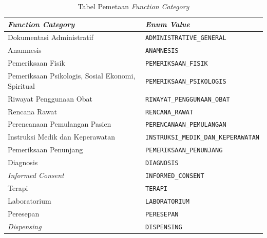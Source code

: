 \documentclass[bahasa, 12pt, a4paper, onecolumn, oneside, final]{report}
\begin{document}
\begin{table}[!ht]
	\centering
	\caption{Tabel Pemetaan \textit{Function Category}}
	\label{tab:mapping-function-category}
	\small
	\begin{tabular}{|p{}|p{}|}
		\hline
		\textbf{\textit{Function Category}} & \textbf{\textit{Enum Value}}                \\ \hline

		Dokumentasi Administratif
		                                    & \texttt{ADMINISTRATIVE\_GENERAL}
		\\ \hline

		Anamnesis
		                                    & \texttt{ANAMNESIS}
		\\ \hline

		Pemeriksaan Fisik
		                                    & \texttt{PEMERIKSAAN\_FISIK}
		\\ \hline

		Pemeriksaan Psikologis, Sosial Ekonomi, Spiritual
		                                    & \texttt{PEMERIKSAAN\_PSIKOLOGIS}
		\\ \hline

		Riwayat Penggunaan Obat
		                                    & \texttt{RIWAYAT\_PENGGUNAAN\_OBAT}
		\\ \hline

		Rencana Rawat
		                                    & \texttt{RENCANA\_RAWAT}
		\\ \hline

		Perencanaan Pemulangan Pasien
		                                    & \texttt{PERENCANAAN\_PEMULANGAN}
		\\ \hline

		Instruksi Medik dan Keperawatan
		                                    & \texttt{INSTRUKSI\_MEDIK\_DAN\_KEPERAWATAN}
		\\ \hline

		Pemeriksaan Penunjang
		                                    & \texttt{PEMERIKSAAN\_PENUNJANG}
		\\ \hline

		Diagnosis
		                                    & \texttt{DIAGNOSIS}
		\\ \hline

		\textit{Informed Consent}
		                                    & \texttt{INFORMED\_CONSENT}
		\\ \hline

		Terapi
		                                    & \texttt{TERAPI}
		\\ \hline

		Laboratorium
		                                    & \texttt{LABORATORIUM}
		\\ \hline

		Peresepan
		                                    & \texttt{PERESEPAN}
		\\ \hline

		\textit{Dispensing}
		                                    & \texttt{DISPENSING}
		\\ \hline
	\end{tabular}

\end{table}
\end{document}
